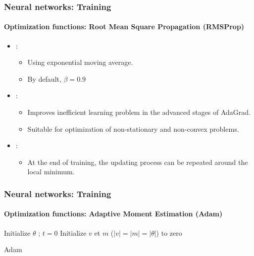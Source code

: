 \documentclass[xcolor=table]{beamer}
\begin{document}
\begin{frame}
	\frametitle{Neural networks: Training}
	\framesubtitle{Optimization functions: Root Mean Square Propagation (RMSProp)}

\begin{itemize}
	\item {}: 
	\begin{itemize}
		\item Using exponential moving average.
		\item By default, $\beta = 0.9$ 
	\end{itemize}
	\item {}: 
	\begin{itemize}
		\item Improves inefficient learning problem in the advanced stages of AdaGrad.
		\item Suitable for optimization of non-stationary and non-convex problems.
	\end{itemize}
	\item {}: 
	\begin{itemize}
		\item At the end of training, the updating process can be repeated around the local minimum.
	\end{itemize}
\end{itemize}

\end{frame}

\begin{frame}
	\frametitle{Neural networks: Training}
	\framesubtitle{Optimization functions: Adaptive Moment Estimation (Adam)}

\begin{algorithm}[H]
	\KwResult{$ \theta $}
	Initialize $ \theta $ ; $ t = 0 $\;
	Initialize $v$ et $m$ ($|v| = |m| = |\theta|$) to zero\;
	\caption{Adam \cite{2015-kingma-ba}}
\end{algorithm}

\end{frame}
\end{document}

